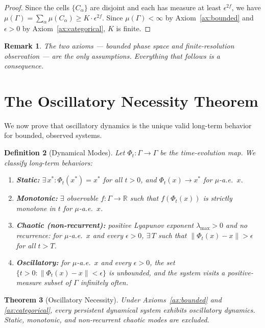 \documentclass[11pt,twocolumn,a4paper]{article}
\newtheorem{theorem}{Theorem}[section]
\newtheorem{definition}[theorem]{Definition}
\newtheorem{remark}[theorem]{Remark}
\newcommand{\R}{\mathbb{R}}
\begin{document}
\begin{proof}
Since the cells $\{C_\alpha\}$ are disjoint and each has measure at
least $\epsilon^{2f}$, we have $\mu(\Gamma) = \sum_\alpha
\mu(C_\alpha) \geq K \cdot \epsilon^{2f}$. Since $\mu(\Gamma) < \infty$
by Axiom~\ref{ax:bounded} and $\epsilon > 0$ by
Axiom~\ref{ax:categorical}, $K$ is finite.
\end{proof}

\begin{remark}
The two axioms --- bounded phase space and finite-resolution
observation --- are the only assumptions. Everything that follows
is a consequence.
\end{remark}


\section{The Oscillatory Necessity Theorem}
\label{sec:oscillatory}

We now prove that oscillatory dynamics is the unique valid
long-term behavior for bounded, observed systems.

\begin{definition}[Dynamical Modes]
\label{def:modes}
Let $\Phi_t : \Gamma \to \Gamma$ be the time-evolution map. We
classify long-term behaviors:
\begin{enumerate}[label=(\roman*),leftmargin=*]
\item \textbf{Static:} $\exists\,x^* : \Phi_t(x^*) = x^*$ for all
  $t > 0$, and $\Phi_t(x) \to x^*$ for $\mu$-a.e.\ $x$.
\item \textbf{Monotonic:} $\exists$ observable $f : \Gamma \to \R$
  such that $f(\Phi_t(x))$ is strictly monotone in $t$ for
  $\mu$-a.e.\ $x$.
\item \textbf{Chaotic (non-recurrent):} positive Lyapunov exponent
  $\lambda_{\max} > 0$ and no recurrence: for $\mu$-a.e.\ $x$ and
  every $\epsilon > 0$, $\exists\,T$ such that
  $\|\Phi_t(x) - x\| > \epsilon$ for all $t > T$.
\item \textbf{Oscillatory:} for $\mu$-a.e.\ $x$ and every
  $\epsilon > 0$, the set
  $\{t > 0 : \|\Phi_t(x) - x\| < \epsilon\}$ is unbounded, and the
  system visits a positive-measure subset of $\Gamma$ infinitely often.
\end{enumerate}
\end{definition}

\begin{theorem}[Oscillatory Necessity]
\label{thm:oscillatory-necessity}
Under Axioms~\ref{ax:bounded} and \ref{ax:categorical}, every
persistent dynamical system exhibits oscillatory dynamics. Static,
monotonic, and non-recurrent chaotic modes are excluded.
\end{theorem}
\end{document}
